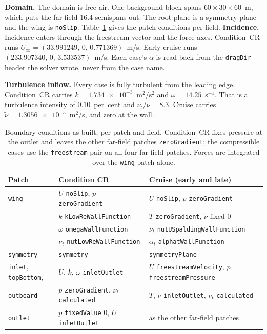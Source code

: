 \textbf{Domain.} The domain is free air. One background block spans $60\times30\times60$~m,
which puts the far field $16.4$ semispans out. The root plane is a symmetry plane and the wing
is \texttt{noSlip}. Table~\ref{tab:setup:bc} gives the patch conditions per field.
\textbf{Incidence.} Incidence enters through the freestream vector and the force axes.
Condition~CR runs $U_\infty = (33.991249,\,0,\,0.771369)$~m/s. Early cruise runs
$(233.907340,\,0,\,3.533537)$~m/s. Each case's $\alpha$ is read back from the \texttt{dragDir}
header the solver wrote, never from the case name.

\textbf{Turbulence inflow.} Every case is fully turbulent from the leading edge. Condition~CR
carries $k = \num{1.734e-3}$~m$^2$/s$^2$ and $\omega = 14.25$~s$^{-1}$. That is a turbulence
intensity of $0.10$~per~cent and $\nu_t/\nu = 8.3$. Cruise carries
$\tilde{\nu} = \num{1.3056e-5}$~m$^2$/s, and zero at the wall.

\begin{table}[htbp]
  \centering
  \scriptsize
  \caption{Boundary conditions as built, per patch and field. Condition~CR fixes pressure at the
  outlet and leaves the other far-field patches \texttt{zeroGradient}; the compressible cases use
  the \texttt{freestream} pair on all four far-field patches. Forces are integrated over the
  \texttt{wing} patch alone.}
  \label{tab:setup:bc}
  \begin{tabular}{lll}
    \toprule
    Patch & Condition CR & Cruise (early and late) \\
    \midrule
    \texttt{wing}   & $U$ \texttt{noSlip}, $p$ \texttt{zeroGradient}
                    & $U$ \texttt{noSlip}, $p$ \texttt{zeroGradient} \\
                    & $k$ \texttt{kLowReWallFunction}
                    & $T$ \texttt{zeroGradient}, $\tilde{\nu}$ fixed $0$ \\
                    & $\omega$ \texttt{omegaWallFunction}
                    & $\nu_t$ \texttt{nutUSpaldingWallFunction} \\
                    & $\nu_t$ \texttt{nutLowReWallFunction}
                    & $\alpha_t$ \texttt{alphatWallFunction} \\
    \midrule
    \texttt{symmetry} & \texttt{symmetry} & \texttt{symmetryPlane} \\
    \midrule
    \texttt{inlet}, \texttt{topBottom}, & $U$, $k$, $\omega$ \texttt{inletOutlet}
                    & $U$ \texttt{freestreamVelocity}, $p$ \texttt{freestreamPressure} \\
    \texttt{outboard} & $p$ \texttt{zeroGradient}, $\nu_t$ \texttt{calculated}
                    & $T$, $\tilde{\nu}$ \texttt{inletOutlet}, $\nu_t$ \texttt{calculated} \\
    \midrule
    \texttt{outlet} & $p$ \texttt{fixedValue} $0$, $U$ \texttt{inletOutlet}
                    & as the other far-field patches \\
    \bottomrule
  \end{tabular}
\end{table}

